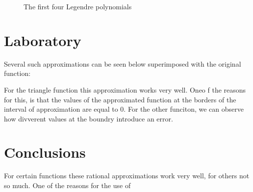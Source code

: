 \begin{figure}[h!]
\begin{center}
\end{center}

\label{app_fig}
\caption{The first four Legendre polynomials}
\end{figure}




\section{Laboratory}
Several such approximations can be seen below superimposed with the original function:


For the triangle function this approximation works very well. Oneo f the reasons for this, is that the values of the approximated function at the borders of the interval of approximation are equal to 0. For the other funciton, we can observe how divverent values at the boundry introduce an error.

\section{Conclusions}
For certain functions these rational approximations work very well, for others not so much. One of the reasons for the use of 

